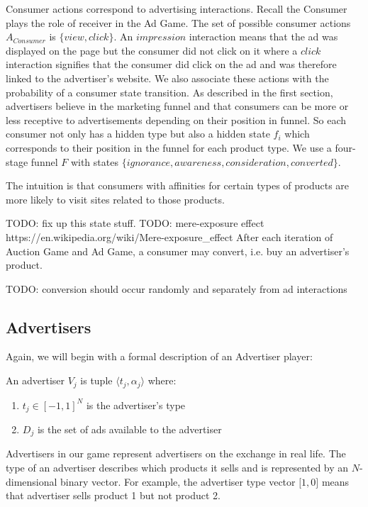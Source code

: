 \documentclass{article}
\begin{document}
Consumer actions correspond to advertising interactions. Recall the Consumer plays the role of receiver in the Ad Game. The set of possible consumer actions $A_{Consumer}$ is $\{view, click\}$. An $impression$ interaction means that the ad was displayed on the page but the consumer did not click on it where a $click$ interaction signifies that the consumer did click on the ad and was therefore linked to the advertiser's website. We also associate these actions with the probability of a consumer state transition. As described in the first section, advertisers believe in the marketing funnel and that consumers can be more or less receptive to advertisements depending on their position in funnel. So each consumer not only has a hidden type but also a hidden state $f_i$ which corresponds to their position in the funnel for each product type. We use a four-stage funnel $F$ with states $\{ignorance, awareness, consideration, converted\}$. 

The intuition is that consumers with affinities for certain types of products are more likely to visit sites related to those products.

TODO: fix up this state stuff.
TODO: mere-exposure effect https://en.wikipedia.org/wiki/Mere-exposure\_effect
After each iteration of Auction Game and Ad Game, a consumer may convert, i.e. buy an advertiser's product.

TODO: conversion should occur randomly and separately from ad interactions

\subsection{Advertisers}

Again, we will begin with a formal description of an Advertiser player:

An advertiser $V_j$ is tuple $\langle t_j, \alpha_j \rangle$ where:

\begin{enumerate}
	\item $t_j \in [-1,1]^N$ is the advertiser's type
	\item $D_j$ is the set of ads available to the advertiser
\end{enumerate}

Advertisers in our game represent advertisers on the exchange in real life. The type of an advertiser describes which products it sells and is represented by an $N$-dimensional binary vector. For example, the advertiser type vector $\lbrack 1, 0 \rbrack$ means that advertiser sells product 1 but not product 2.
\end{document}
